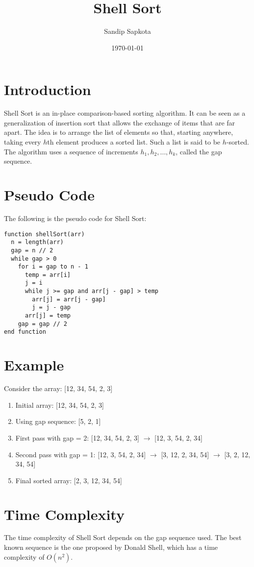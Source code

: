 \documentclass{article}
\title{Shell Sort}
\author{Sandip Sapkota}
\date{\today}
\begin{document}
\maketitle

\section*{Introduction}
Shell Sort is an in-place comparison-based sorting algorithm. It can be seen as a generalization of insertion sort that allows the exchange of items that are far apart. The idea is to arrange the list of elements so that, starting anywhere, taking every $h$th element produces a sorted list. Such a list is said to be $h$-sorted. The algorithm uses a sequence of increments $h_1, h_2, \ldots, h_k$, called the gap sequence.

\section*{Pseudo Code}
The following is the pseudo code for Shell Sort:

\begin{verbatim}
function shellSort(arr)
  n = length(arr)
  gap = n // 2
  while gap > 0
    for i = gap to n - 1
      temp = arr[i]
      j = i
      while j >= gap and arr[j - gap] > temp
        arr[j] = arr[j - gap]
        j = j - gap
      arr[j] = temp
    gap = gap // 2
end function
\end{verbatim}

\section*{Example}
Consider the array: [12, 34, 54, 2, 3]

\begin{enumerate}
  \item Initial array: [12, 34, 54, 2, 3]
  \item Using gap sequence: [5, 2, 1]
  \item First pass with gap = 2: [12, 34, 54, 2, 3] $\rightarrow$ [12, 3, 54, 2, 34]
  \item Second pass with gap = 1: [12, 3, 54, 2, 34] $\rightarrow$ [3, 12, 2, 34, 54] $\rightarrow$ [3, 2, 12, 34, 54]
  \item Final sorted array: [2, 3, 12, 34, 54]
\end{enumerate}

\section*{Time Complexity}
The time complexity of Shell Sort depends on the gap sequence used. The best known sequence is the one proposed by Donald Shell, which has a time complexity of $O(n^2)$.
\end{document}
